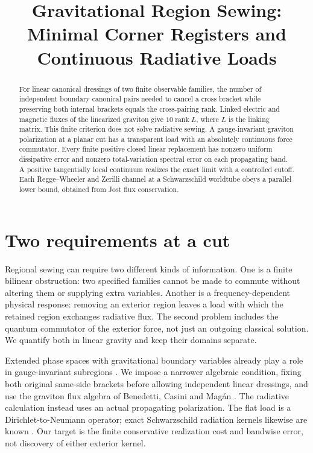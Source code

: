 \documentclass[11pt]{article}
\title{Gravitational Region Sewing: Minimal Corner Registers and Continuous Radiative Loads}
\author{}
\date{}
\begin{document}
\maketitle
\begin{abstract}
For linear canonical dressings of two finite observable families, the number of independent boundary canonical pairs needed to cancel a cross bracket while preserving both internal brackets equals the cross-pairing rank. Linked electric and magnetic fluxes of the linearized graviton give \(10\operatorname{rank} L\), where \(L\) is the linking matrix. This finite criterion does not solve radiative sewing. A gauge-invariant graviton polarization at a planar cut has a transparent load with an absolutely continuous force commutator. Every finite positive closed linear replacement has nonzero uniform dissipative error and nonzero total-variation spectral error on each propagating band. A positive tangentially local continuum realizes the exact limit with a controlled cutoff. Each Regge--Wheeler and Zerilli channel at a Schwarzschild worldtube obeys a parallel lower bound, obtained from Jost flux conservation.
\end{abstract}

\section{Two requirements at a cut}
Regional sewing can require two different kinds of information. One is a finite bilinear obstruction: two specified families cannot be made to commute without altering them or supplying extra variables. Another is a frequency-dependent physical response: removing an exterior region leaves a load with which the retained region exchanges radiative flux. The second problem includes the quantum commutator of the exterior force, not just an outgoing classical solution. We quantify both in linear gravity and keep their domains separate.

Extended phase spaces with gravitational boundary variables already play a role in gauge-invariant subregions \cite{DonnellyFreidel,FreidelGeillerPranzetti}. We impose a narrower algebraic condition, fixing both original same-side brackets before allowing independent linear dressings, and use the graviton flux algebra of Benedetti, Casini and Mag\'an \cite{BCM}. The radiative calculation instead uses an actual propagating polarization. The flat load is a Dirichlet-to-Neumann operator; exact Schwarzschild radiation kernels likewise are known \cite{Lau}. Our target is the finite conservative realization cost and bandwise error, not discovery of either exterior kernel.
\end{document}
